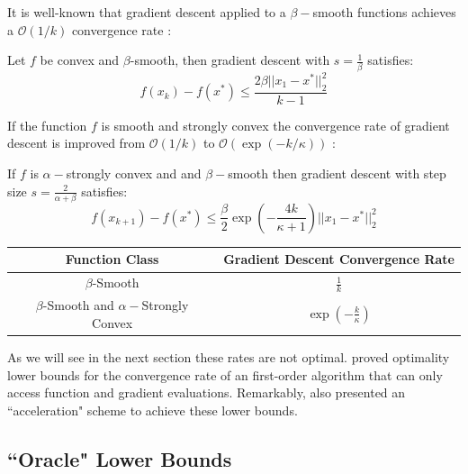 It is well-known that gradient descent applied to a $\beta-$smooth functions achieves a $\mathcal{O}(1/k)$ convergence rate \citep{DBLP:journals/ftml/Bubeck15}:

\begin{theorem}
Let $f$ be convex and $\beta$-smooth, then gradient descent with $s = \frac{1}{\beta}$ satisfies:
\begin{equation}
f(x_k) - f(x^*) \leq \frac{2\beta ||x_1 - x^* ||_2^2}{k-1}
\end{equation}
\end{theorem}

If the function $f$ is smooth and strongly convex the convergence rate of gradient descent is improved from $\mathcal{O}(1/k)$ to $\mathcal{O}(\exp(-k/\kappa))$ \citep{DBLP:journals/ftml/Bubeck15}:

\begin{theorem}
If $f$ is $\alpha-$strongly convex and and $\beta-$smooth then gradient descent with step size $s = \frac{2}{\alpha+\beta}$ satisfies:
\begin{equation}
f (x_{k+1}) - f(x^*) \leq \frac{\beta}{2} \exp(-\frac{4k}{\kappa+1}) ||x_1-x^*||_2^2
\end{equation}
\end{theorem}

\begin{center}
 \begin{tabular}{||c c ||} 
 \hline
 Function Class  & Gradient Descent Convergence Rate \\ [0.5ex] 
 \hline\hline
 $\beta$-Smooth  & $\frac{1 }{k}$  \\ [1ex]
 \hline
 $\beta$-Smooth and $\alpha-$Strongly Convex   & $\exp\left(-\frac{k}{\kappa}\right)$  \\[1ex]
 \hline
\end{tabular}
\end{center}
As we will see in the next section these rates are not optimal.  \citet{blair1985problem} proved optimality lower bounds for the convergence rate of an first-order algorithm that can only access function and gradient evaluations. Remarkably, \citet{nesterov2004introductory} also presented an ``acceleration" scheme to achieve these lower bounds.

\subsection{``Oracle" Lower Bounds}

